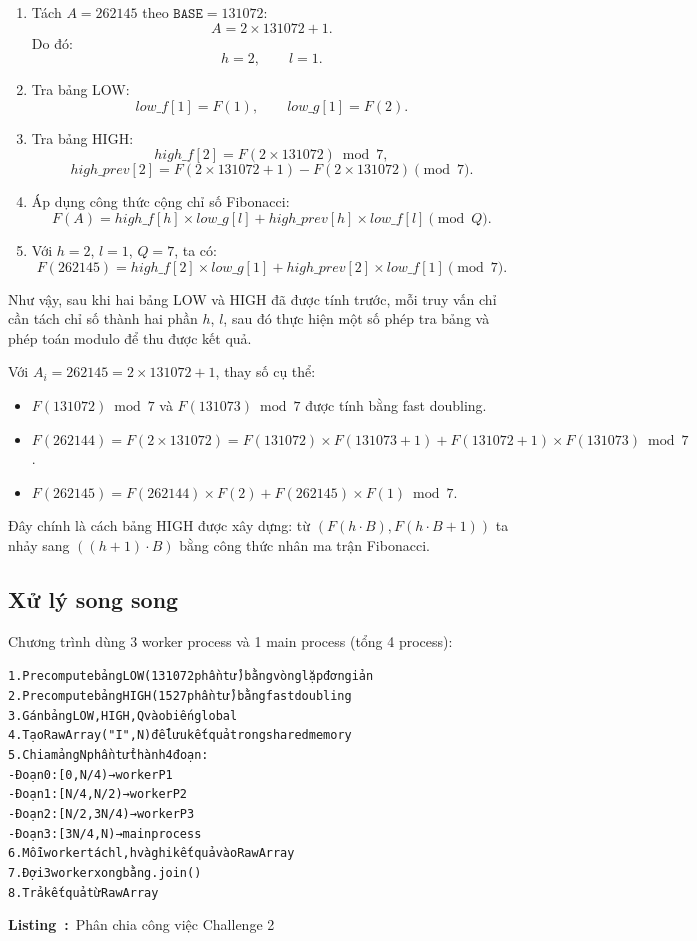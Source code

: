 \documentclass[12pt,a4paper]{article}
\newcounter{vietlisting}
\newenvironment{vietlisting}[1]{%
  \def\vietlistingcaption{#1}%
  \refstepcounter{vietlisting}%
  \begin{tcolorbox}[
    enhanced,
    breakable,
    colback=codebg,
    colframe=codeframe,
    boxrule=0.5pt,
    arc=1mm,
    left=6pt,
    right=6pt,
    top=6pt,
    bottom=4pt
  ]%
  \small\ttfamily\begin{alltt}
}{%
  \end{alltt}\normalfont
  \end{tcolorbox}%
  \begin{center}
    \small\textbf{Listing~\thevietlisting:}~\vietlistingcaption
  \end{center}
}
\begin{document}
\begin{enumerate}
  \item Tách $A = 262145$ theo $\texttt{BASE}=131072$:
  \[
    A = 2 \times 131072 + 1.
  \]
  Do đó:
  \[
    h = 2,\qquad l = 1.
  \]

  \item Tra bảng LOW:
  \[
    low\_f[1] = F(1), \qquad low\_g[1] = F(2).
  \]

  \item Tra bảng HIGH:
  \[
    high\_f[2] = F(2 \times 131072) \bmod 7,
  \]
  \[
    high\_prev[2] = F(2 \times 131072 + 1) - F(2 \times 131072) \pmod{7}.
  \]

  \item Áp dụng công thức cộng chỉ số Fibonacci:
  \[
    F(A) =
    high\_f[h] \times low\_g[l]
    + high\_prev[h] \times low\_f[l]
    \pmod{Q}.
  \]

  \item Với $h=2$, $l=1$, $Q=7$, ta có:
  \[
    F(262145) =
    high\_f[2] \times low\_g[1]
    + high\_prev[2] \times low\_f[1]
    \pmod{7}.
  \]
\end{enumerate}

Như vậy, sau khi hai bảng LOW và HIGH đã được tính trước, mỗi truy vấn chỉ cần tách chỉ số thành hai phần $h$, $l$, sau đó thực hiện một số phép tra bảng và phép toán modulo để thu được kết quả.

Với $A_i = 262145 = 2 \times 131072 + 1$, thay số cụ thể:
\begin{itemize}
  \item $F(131072) \bmod 7$ và $F(131073) \bmod 7$ được tính bằng fast doubling.
  \item $F(262144) = F(2 \times 131072) = F(131072) \times F(131073+1) + F(131072+1) \times F(131073) \bmod 7$.
  \item $F(262145) = F(262144) \times F(2) + F(262145) \times F(1) \bmod 7$.
\end{itemize}

Đây chính là cách bảng HIGH được xây dựng: từ $(F(h \cdot B), F(h \cdot B + 1))$ ta nhảy sang $((h+1) \cdot B)$ bằng công thức nhân ma trận Fibonacci.

\subsection{Xử lý song song}

Chương trình dùng 3 worker process và 1 main process (tổng 4 process):

\begin{vietlisting}{Phân chia công việc Challenge 2}
1. Precompute bảng LOW (131072 phần tử) bằng vòng lặp đơn giản
2. Precompute bảng HIGH (1527 phần tử) bằng fast doubling
3. Gán bảng LOW, HIGH, Q vào biến global
4. Tạo RawArray("I", N) để lưu kết quả trong shared memory
5. Chia mảng N phần tử thành 4 đoạn:
   - Đoạn 0: [0, N/4)      → worker P1
   - Đoạn 1: [N/4, N/2)    → worker P2
   - Đoạn 2: [N/2, 3N/4)   → worker P3
   - Đoạn 3: [3N/4, N)     → main process
6. Mỗi worker tách l, h và ghi kết quả vào RawArray
7. Đợi 3 worker xong bằng .join()
8. Trả kết quả từ RawArray
\end{vietlisting}
\end{document}
